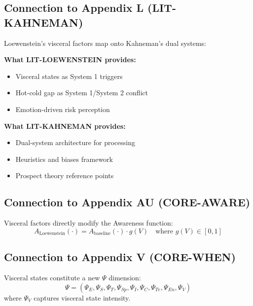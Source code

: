 \subsection{Connection to Appendix L (LIT-KAHNEMAN)}

Loewenstein's visceral factors map onto Kahneman's dual systems:

\begin{tcolorbox}[colback=yellow!5!white, colframe=yellow!75!black,
    title=Integration: LIT-LOEWENSTEIN $\leftrightarrow$ LIT-KAHNEMAN]
\textbf{What LIT-LOEWENSTEIN provides:}
\begin{itemize}[nosep]
\item Visceral states as System 1 triggers
\item Hot-cold gap as System 1/System 2 conflict
\item Emotion-driven risk perception
\end{itemize}

\textbf{What LIT-KAHNEMAN provides:}
\begin{itemize}[nosep]
\item Dual-system architecture for processing
\item Heuristics and biases framework
\item Prospect theory reference points
\end{itemize}
\end{tcolorbox}

\subsection{Connection to Appendix AU (CORE-AWARE)}

Visceral factors directly modify the Awareness function:
\begin{equation}
A_{\text{Loewenstein}}(\cdot) = A_{\text{baseline}}(\cdot) \cdot g(V) \quad \text{where } g(V) \in [0,1]
\end{equation}

\subsection{Connection to Appendix V (CORE-WHEN)}

Visceral states constitute a new $\Psi$ dimension:
\begin{equation}
\Psi = (\Psi_E, \Psi_S, \Psi_T, \Psi_{Sp}, \Psi_I, \Psi_C, \Psi_{Te}, \Psi_{En}, \textbf{$\Psi_V$})
\end{equation}
where $\Psi_V$ captures visceral state intensity.


